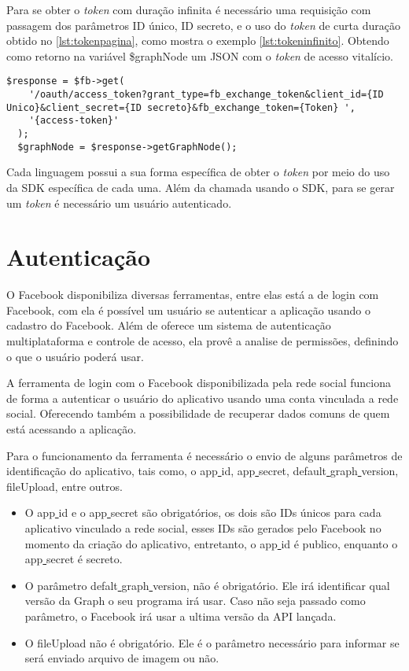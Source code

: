 Para se obter o \textit{token} com duração infinita é necessário uma requisição com passagem dos parâmetros ID único, ID secreto, e o uso do \textit{token} de curta duração obtido no \ref{lst:tokenpagina}, como mostra o exemplo \ref{lst:tokeninfinito}. Obtendo como retorno na variável \$graphNode um JSON com o \textit{token} de acesso vitalício.

\begin{lstlisting}[caption={Obtendo Token Infinito},label={lst:tokeninfinito}]
  $response = $fb->get(
    '/oauth/access_token?grant_type=fb_exchange_token&client_id={ID Unico}&client_secret={ID secreto}&fb_exchange_token={Token} ',
    '{access-token}'
  );
  $graphNode = $response->getGraphNode();
\end{lstlisting}

Cada linguagem possui a sua forma específica de obter o \textit{token} por meio do uso da SDK específica de cada uma. Além da chamada usando o SDK, para se gerar um \textit{token} é necessário um usuário autenticado.

\section{Autenticação}
O Facebook disponibiliza diversas ferramentas, entre elas está a de login com Facebook, com ela é possível um usuário se autenticar a aplicação usando o cadastro do Facebook. Além de oferece um sistema de autenticação multiplataforma e controle de acesso, ela provê a analise de permissões, definindo o que o usuário poderá usar. \cite{facebook2018c}

A ferramenta de login com o Facebook disponibilizada pela rede social funciona de forma a autenticar o usuário do aplicativo usando uma conta vinculada a rede social. Oferecendo também a possibilidade de recuperar dados comuns de quem está acessando a aplicação.

Para o funcionamento da ferramenta é necessário o envio de alguns parâmetros de identificação do aplicativo, tais como, o app\underline{{ }}id, app\underline{{ }}secret, default\underline{{ }}graph\underline{{ }}version, fileUpload, entre outros.

\begin{itemize}
\item O app\underline{{ }}id e o app\underline{{ }}secret são obrigatórios, os dois são IDs únicos para cada aplicativo vinculado a rede social, esses IDs são gerados pelo Facebook no momento da criação do aplicativo, entretanto, o app\underline{{ }}id é publico, enquanto o app\underline{{ }}secret é secreto.

\item O parâmetro defalt\underline{{ }}graph\underline{{ }}version, não é obrigatório. Ele irá identificar qual versão da Graph o seu programa irá usar. Caso não seja passado como parâmetro, o Facebook irá usar a ultima versão da API lançada.

\item O fileUpload não é obrigatório. Ele é o parâmetro necessário para informar se será enviado arquivo de imagem ou não.
\end{itemize}

